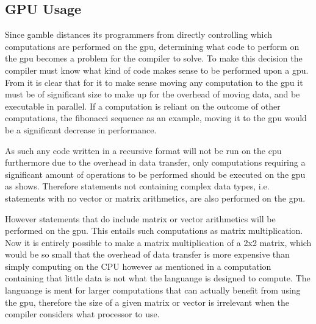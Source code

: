 \subsection*{GPU Usage}\label{GPUCode}
Since \gls{gamble} distances its programmers from directly controlling which computations are performed on the \acrshort{gpu}, determining what code to perform on the \acrshort{gpu} becomes a problem for the compiler to solve.
To make this decision the compiler must know what kind of code makes sense to be performed upon a \acrshort{gpu}.
From  it is clear that for it to make sense moving any computation to the \acrshort{gpu} it must be of significant size to make up for the overhead of moving data, and be executable in parallel.
If a computation is reliant on the outcome of other computations, the fibonacci sequence as an example, moving it to the \acrshort{gpu} would be a significant decrease in performance.

As such any code written in a recursive format will not be run on the \acrshort{cpu} furthermore due to the overhead in data transfer, only computations requiring a significant amount of operations to be performed should be executed on the \acrshort{gpu} as  shows.
Therefore statements not containing complex data types, i.e. statements with no vector or matrix arithmetics, are also performed on the \acrshort{gpu}.

However statements that do include matrix or vector arithmetics will be performed on the \acrshort{gpu}.
This entails such computations as matrix multiplication.
Now it is entirely possible to make a matrix multiplication of a 2x2 matrix, which would be so small that the overhead of data transfer is more expensive than simply computing on the CPU however as mentioned in  a computation containing that little data is not what the languange is designed to compute.
The languange is ment for larger computations that can actually benefit from using the \acrshort{gpu}, therefore the size of a given matrix or vector is irrelevant when the compiler considers what processor to use.